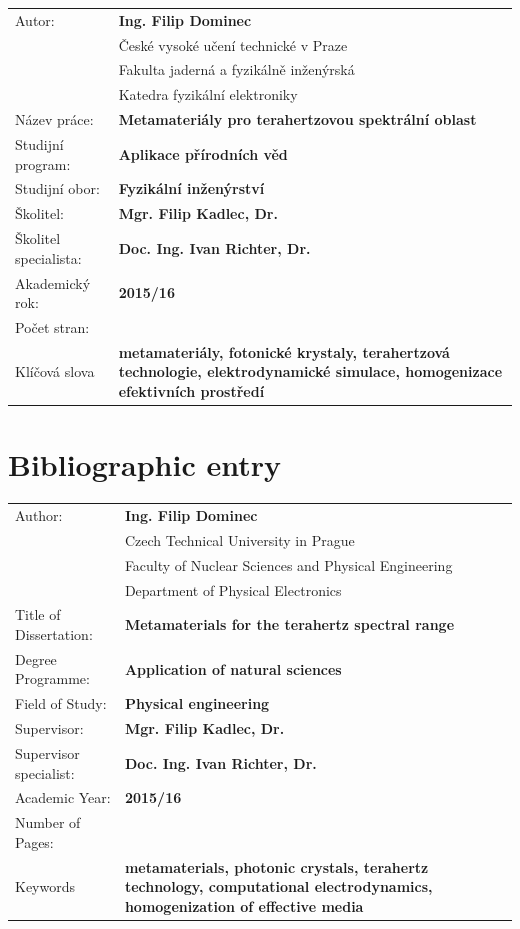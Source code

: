 \bgroup {}
\noindent\begin{tabular}{p{.25\linewidth}p{.7\linewidth}}
Autor:					&\textbf{Ing. Filip Dominec} \\
					~	&České vysoké učení technické v Praze\\
					~	&Fakulta jaderná a fyzikálně inženýrská\\ 
					~	&Katedra fyzikální elektroniky\\
Název práce:			&\textbf{Metamateriály pro terahertzovou spektrální oblast} \\
Studijní program:		&\textbf{Aplikace přírodních věd} \\
Studijní obor:			&\textbf{Fyzikální inženýrství} \\
Školitel:				&\textbf{Mgr. Filip Kadlec, Dr.} \\
Školitel specialista:	&\textbf{Doc. Ing. Ivan Richter, Dr.} \\
Akademický rok:			&\textbf{2015/16} \\			%
Počet stran:			&\textbf{\pageref{enddocument}} \\  %
Klíčová slova			&\textbf{metamateriály, fotonické krystaly, terahertzová technologie, elektrodynamické simulace, homogenizace efektivních prostředí} \\
\end{tabular}
\egroup

\thispagestyle{empty} \newpage

\chapter*{Bibliographic entry}
\bgroup {}
\noindent\begin{tabular}{p{.25\linewidth}p{.7\linewidth}}
Author:					&\textbf{Ing. Filip Dominec} \\
					~	&Czech Technical University in Prague\\
					~	&Faculty of Nuclear Sciences and Physical Engineering\\ 
					~	&Department of Physical Electronics\\
Title of Dissertation:	&\textbf{Metamaterials for the terahertz spectral range} \\
Degree Programme:		&\textbf{Application of natural sciences} \\
Field of Study:			&\textbf{Physical engineering} \\
Supervisor:				&\textbf{Mgr. Filip Kadlec, Dr.} \\
Supervisor specialist:	&\textbf{Doc. Ing. Ivan Richter, Dr.} \\
Academic Year:			&\textbf{2015/16} \\
Number of Pages:		&\textbf{\pageref{enddocument}} \\
Keywords				&\textbf{metamaterials, photonic crystals, terahertz technology, computational electrodynamics, homogenization of effective media} \\
\end{tabular}
\egroup
\thispagestyle{empty} \newpage

